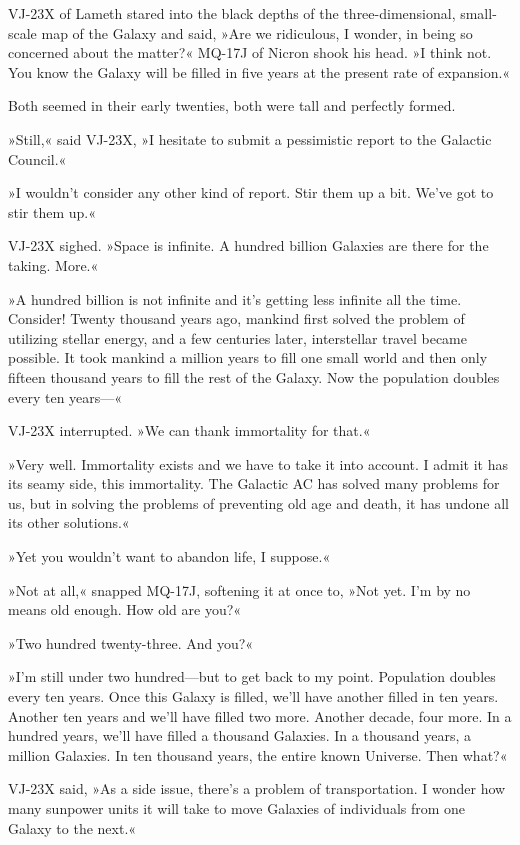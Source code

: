 \documentclass[11pt,twocolumn,paper=a5,pagesize,twoside]{scrartcl}
\newcommand{\q}[1]{»#1«}
\newcommand{\futuretwo}[1]{ #1 }
\newcommand{\initial}[1]{ \lettrine[lines=3,lhang=0.3,nindent=0em]{  {\textsf{#1}}}{}}
\begin{document}
\futuretwo{
\initial{V}J-23X of Lameth stared into the black depths of the 
three-dimensional, small-scale map of the Galaxy and said, \q{Are we 
ridiculous, I wonder, in being so concerned about the matter?}
MQ-17J of Nicron shook his head. \q{I think not. You know the Galaxy 
will be filled in five years at the present rate of expansion.}

Both seemed in their early twenties, both were tall and perfectly formed.

\q{Still,} said VJ-23X, \q{I hesitate to submit a pessimistic report to the 
Galactic Council.}

\q{I wouldn't consider any other kind of report. Stir them up a bit. We've 
got to stir them up.}

VJ-23X sighed. \q{Space is infinite. A hundred billion Galaxies are there 
for the taking. More.}

\q{A hundred billion is not infinite and it's getting less infinite all the 
time. Consider! Twenty thousand years ago, mankind first solved the problem 
of utilizing stellar energy, and a few centuries later, interstellar travel 
became possible. It took mankind a million years to fill one small world and 
then only fifteen thousand years to fill the rest of the Galaxy. Now the 
population doubles every ten years---}

VJ-23X interrupted. \q{We can thank immortality for that.}

\q{Very well. Immortality exists and we have to take it into account. I admit 
it has its seamy side, this immortality. The Galactic AC has solved many 
problems for us, but in solving the problems of preventing old age and death, 
it has undone all its other solutions.}

\q{Yet you wouldn't want to abandon life, I suppose.}

\q{Not at all,} snapped MQ-17J, softening it at once to, \q{Not yet. I'm by 
no means old enough. How old are you?}

\q{Two hundred twenty-three. And you?}

\q{I'm still under two hundred---but to get back to my point. Population 
doubles every ten years. Once this Galaxy is filled, we'll have another 
filled in ten years. Another ten years and we'll have filled two more. 
Another decade, four more. In a hundred years, we'll have filled a thousand
Galaxies. In a thousand years, a million Galaxies. In ten thousand years, 
the entire known Universe. Then what?}

VJ-23X said, \q{As a side issue, there's a problem of transportation. I 
wonder how many sunpower units it will take to move Galaxies of individuals 
from one Galaxy to the next.}

}
\end{document}

